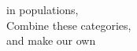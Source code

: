 \documentclass[preview]{standalone}
\begin{document}
\begin{center}
in populations,\\Combine these categories,\\and make our own\\
\end{center}
\end{document}
